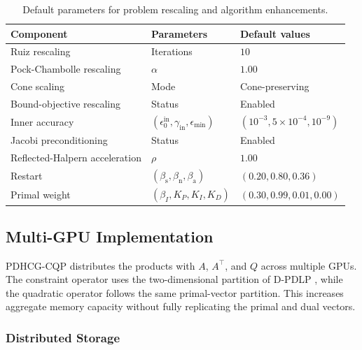 \documentclass[letterpaper]{article} %
\newcommand{\name}{PDHCG-CQP\xspace}
\theoremstyle{definition}
\theoremstyle{remark}
\newcommand{\papertablesetup}{\small\setstretch{1.0}\renewcommand{\arraystretch}{1.2}}
\begin{document}
\begin{table}[t]
    \centering
    \papertablesetup
    \caption{Default parameters for problem rescaling and algorithm
    enhancements.}
    \label{tab:practical-defaults}
    \medskip
    \begin{tabular}{lll}
        \toprule
        Component & Parameters & Default values \\
        \midrule
        Ruiz rescaling
        & Iterations
        & $10$ \\
        Pock-Chambolle rescaling
        & $\alpha$
        & $1.00$ \\
        Cone scaling
        & Mode
        & Cone-preserving \\
        Bound-objective rescaling
        & Status
        & Enabled \\
        \midrule
        Inner accuracy
        & $(\epsilon_{0}^{\mathrm{in}},\gamma_{\mathrm{in}},\epsilon_{\min})$
        & $(10^{-3},5\!\times\!10^{-4},10^{-9})$ \\
        Jacobi preconditioning
        & Status
        & Enabled \\
        Reflected-Halpern acceleration
        & $\rho$
        & $1.00$ \\
        Restart
        & $(\beta_{\mathrm{s}},\beta_{\mathrm{n}},\beta_{\mathrm{a}})$
        & $(0.20,0.80,0.36)$ \\
        Primal weight
        & $(\beta_I,K_P,K_I,K_D)$
        & $(0.30,0.99,0.01,0.00)$ \\
        \bottomrule
    \end{tabular}
\end{table}

\subsection{Multi-GPU Implementation}
\label{sec:distributed}

\name distributes the products with $A$, $A^\top$, and $Q$
across multiple GPUs. The constraint operator uses the two-dimensional
partition of D-PDLP \cite{li2026dpdlp}, while the quadratic operator follows
the same primal-vector partition. This increases aggregate memory capacity
without fully replicating the primal and dual vectors.

\subsubsection{Distributed Storage}
\end{document}
